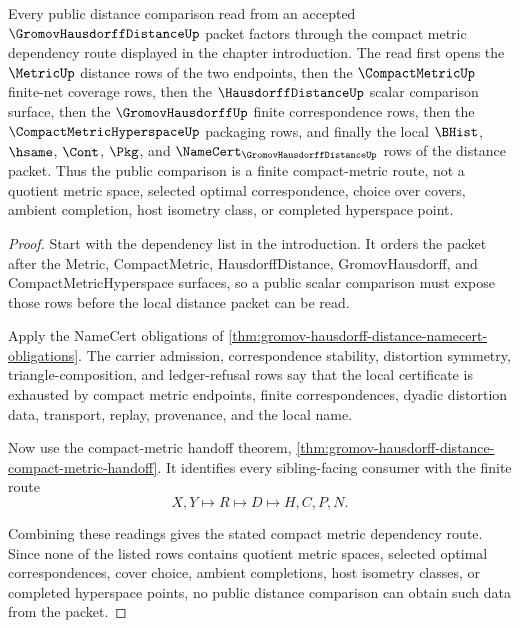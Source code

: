 \begin{theorem}
\label{thm:gromov-hausdorff-distance-compact-metric-route}
Every public distance comparison read from an accepted $\GromovHausdorffDistanceUp$ packet factors through the compact metric dependency route displayed in the chapter introduction. The read first opens the $\MetricUp$ distance rows of the two endpoints, then the $\CompactMetricUp$ finite-net coverage rows, then the $\HausdorffDistanceUp$ scalar comparison surface, then the $\GromovHausdorffUp$ finite correspondence rows, then the $\CompactMetricHyperspaceUp$ packaging rows, and finally the local $\BHist$, $\hsame$, $\Cont$, $\Pkg$, and $\NameCert_{\GromovHausdorffDistanceUp}$ rows of the distance packet. Thus the public comparison is a finite compact-metric route, not a quotient metric space, selected optimal correspondence, choice over covers, ambient completion, host isometry class, or completed hyperspace point.
\end{theorem}
\begin{proof}
Start with the dependency list in the introduction. It orders the packet after the Metric, CompactMetric, HausdorffDistance, GromovHausdorff, and CompactMetricHyperspace surfaces, so a public scalar comparison must expose those rows before the local distance packet can be read.

Apply the NameCert obligations of \autoref{thm:gromov-hausdorff-distance-namecert-obligations}. The carrier admission, correspondence stability, distortion symmetry, triangle-composition, and ledger-refusal rows say that the local certificate is exhausted by compact metric endpoints, finite correspondences, dyadic distortion data, transport, replay, provenance, and the local name.

Now use the compact-metric handoff theorem, \autoref{thm:gromov-hausdorff-distance-compact-metric-handoff}. It identifies every sibling-facing consumer with the finite route
$$
X,Y \longmapsto R \longmapsto D \longmapsto H,C,P,N .
$$

Combining these readings gives the stated compact metric dependency route. Since none of the listed rows contains quotient metric spaces, selected optimal correspondences, cover choice, ambient completions, host isometry classes, or completed hyperspace points, no public distance comparison can obtain such data from the packet.
\end{proof}


